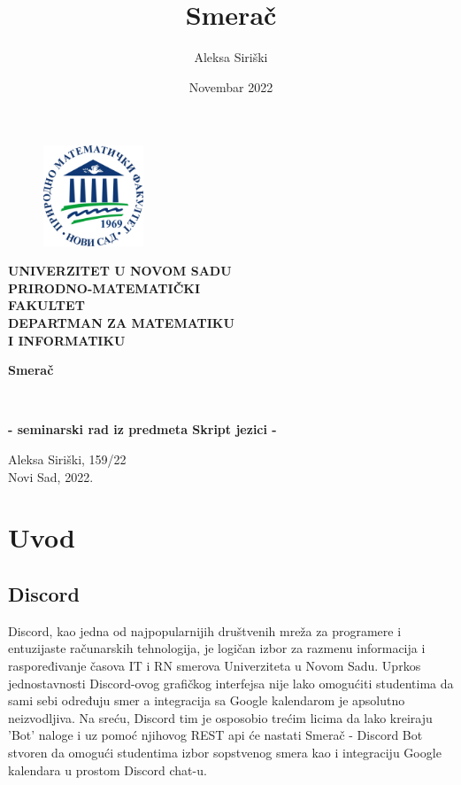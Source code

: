 \documentclass[a4paper,11pt]{article}
\title{Smerač}
\author{Aleksa Siriški}
\date{Novembar 2022}
\begin{document}
\pagestyle{empty}
\begin{center}
    \begin{figure}
        \centering
        \includegraphics[height=3cm,width=3cm]{pmf}
    \end{figure}

    \textbf{
    UNIVERZITET U NOVOM SADU
    \\
    PRIRODNO-MATEMATIČKI
    \\
    FAKULTET
    \\
    DEPARTMAN ZA MATEMATIKU
    \\
    I INFORMATIKU
    }

\end{center}
\vfill
\begin{center}
	\begin{huge}
		\textbf{Smerač}
		\bigskip 
	\end{huge}
	\\
	\begin{large}
        \textbf{- seminarski rad iz predmeta Skript jezici -}
	\end{large}
\end{center}
\vfill
\begin{center}
    Aleksa Siriški, 159/22
    \\
    Novi Sad, 2022.
\end{center}
\newpage

\pagestyle{plain}
\renewcommand{\contentsname}{Sadržaj}
\tableofcontents
\newpage

\pagestyle{fancy}
\fancyhf{}
\cfoot{\thepage}

\section{Uvod}
\subsection{Discord}
Discord\cite{discord}, kao jedna od najpopularnijih društvenih mreža za programere i entuzijaste računarskih tehnologija, je logičan izbor za razmenu informacija i raspoređivanje časova IT i RN smerova Univerziteta u Novom Sadu. Uprkos jednostavnosti Discord-ovog grafičkog interfejsa nije lako omogućiti studentima da sami sebi određuju smer a integracija sa Google kalendarom je apsolutno neizvodljiva. Na sreću, Discord tim je osposobio trećim licima da lako kreiraju 'Bot' naloge i uz pomoć njihovog REST api će nastati Smerač - Discord Bot stvoren da omogući studentima izbor sopstvenog smera kao i integraciju Google kalendara u prostom Discord chat-u.
\end{document}
